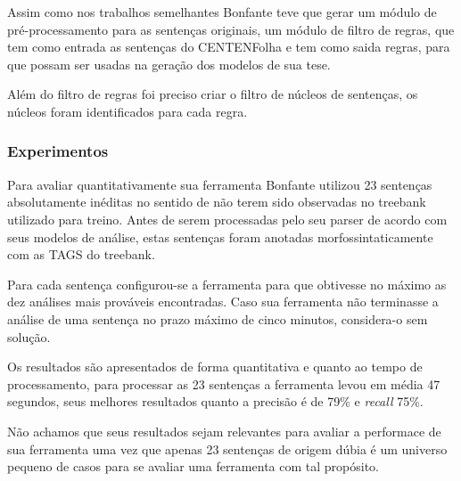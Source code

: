 Assim como nos trabalhos semelhantes Bonfante teve que gerar um módulo de pré-processamento para as sentenças originais, um módulo de filtro de regras, que tem como entrada as sentenças do CENTENFolha e tem como saida regras, para que possam ser usadas na geração dos modelos de sua tese.

Além do filtro de regras foi preciso criar o filtro de núcleos de sentenças, os núcleos foram identificados para cada regra. 


\subsubsection{Experimentos} %
\label{sec:bonfante_experimentos}


Para avaliar quantitativamente sua ferramenta Bonfante utilizou 23 sentenças absolutamente inéditas no sentido de não terem sido observadas no treebank utilizado para treino. Antes de serem processadas pelo seu parser de acordo com seus modelos de análise, estas sentenças foram anotadas morfossintaticamente com as TAGS do treebank.

Para cada sentença configurou-se a ferramenta para que obtivesse no máximo as dez análises mais prováveis encontradas. Caso sua ferramenta não terminasse a análise de uma sentença no prazo máximo de cinco minutos, considera-o sem solução.

Os resultados são apresentados de forma quantitativa e quanto ao tempo de processamento, para processar as 23 sentenças a ferramenta levou em média 47 segundos, seus melhores resultados quanto a precisão é de 79{\%} e \emph{recall} 75{\%}.

Não achamos que seus resultados sejam relevantes para avaliar a performace de sua ferramenta uma vez que apenas 23 sentenças de origem dúbia é um universo pequeno de casos para se avaliar uma ferramenta com tal propósito.





